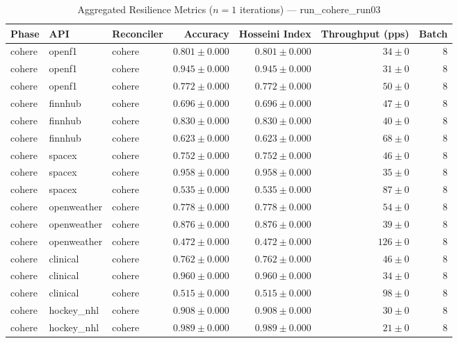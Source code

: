 
\begin{table}[htbp]
\caption{Aggregated Resilience Metrics ($n=1$ iterations) --- run_cohere_run03}
\begin{tabular}{l l l r r r r}
\hline
Phase & API & Reconciler & Accuracy & Hosseini Index & Throughput (pps) & Batch \\
\hline
cohere & openf1 & cohere & $0.801\pm0.000$ & $0.801\pm0.000$ & $34\pm0$ & 8 \\
cohere & openf1 & cohere & $0.945\pm0.000$ & $0.945\pm0.000$ & $31\pm0$ & 8 \\
cohere & openf1 & cohere & $0.772\pm0.000$ & $0.772\pm0.000$ & $50\pm0$ & 8 \\
cohere & finnhub & cohere & $0.696\pm0.000$ & $0.696\pm0.000$ & $47\pm0$ & 8 \\
cohere & finnhub & cohere & $0.830\pm0.000$ & $0.830\pm0.000$ & $40\pm0$ & 8 \\
cohere & finnhub & cohere & $0.623\pm0.000$ & $0.623\pm0.000$ & $68\pm0$ & 8 \\
cohere & spacex & cohere & $0.752\pm0.000$ & $0.752\pm0.000$ & $46\pm0$ & 8 \\
cohere & spacex & cohere & $0.958\pm0.000$ & $0.958\pm0.000$ & $35\pm0$ & 8 \\
cohere & spacex & cohere & $0.535\pm0.000$ & $0.535\pm0.000$ & $87\pm0$ & 8 \\
cohere & openweather & cohere & $0.778\pm0.000$ & $0.778\pm0.000$ & $54\pm0$ & 8 \\
cohere & openweather & cohere & $0.876\pm0.000$ & $0.876\pm0.000$ & $39\pm0$ & 8 \\
cohere & openweather & cohere & $0.472\pm0.000$ & $0.472\pm0.000$ & $126\pm0$ & 8 \\
cohere & clinical & cohere & $0.762\pm0.000$ & $0.762\pm0.000$ & $46\pm0$ & 8 \\
cohere & clinical & cohere & $0.960\pm0.000$ & $0.960\pm0.000$ & $34\pm0$ & 8 \\
cohere & clinical & cohere & $0.515\pm0.000$ & $0.515\pm0.000$ & $98\pm0$ & 8 \\
cohere & hockey\_nhl & cohere & $0.908\pm0.000$ & $0.908\pm0.000$ & $30\pm0$ & 8 \\
cohere & hockey\_nhl & cohere & $0.989\pm0.000$ & $0.989\pm0.000$ & $21\pm0$ & 8 \\

\end{tabular}
\end{table}
